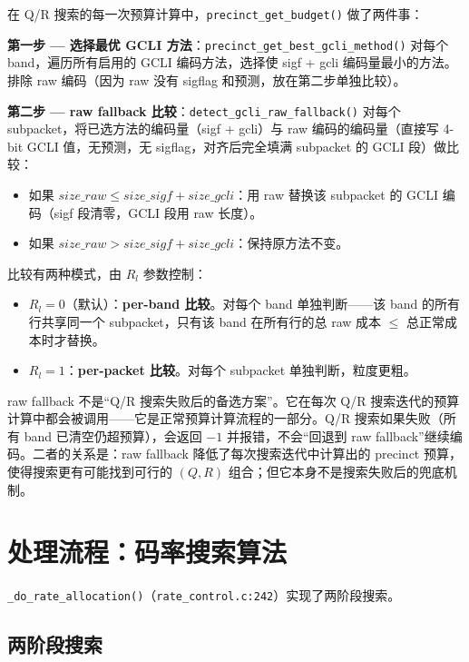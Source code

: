 在 Q/R 搜索的每一次预算计算中，\texttt{precinct\_get\_budget()} 做了两件事：

\textbf{第一步 — 选择最优 GCLI 方法}：\texttt{precinct\_get\_best\_gcli\_method()} 对每个 band，遍历所有启用的 GCLI 编码方法，选择使 sigf + gcli 编码量最小的方法。排除 raw 编码（因为 raw 没有 sigflag 和预测，放在第二步单独比较）。

\textbf{第二步 — raw fallback 比较}：\texttt{detect\_gcli\_raw\_fallback()} 对每个 subpacket，将已选方法的编码量（sigf + gcli）与 raw 编码的编码量（直接写 4-bit GCLI 值，无预测，无 sigflag，对齐后完全填满 subpacket 的 GCLI 段）做比较：

\begin{itemize}
  \item 如果 $\mathit{size\_raw} \leq \mathit{size\_sigf} + \mathit{size\_gcli}$：用 raw 替换该 subpacket 的 GCLI 编码（sigf 段清零，GCLI 段用 raw 长度）。
  \item 如果 $\mathit{size\_raw} > \mathit{size\_sigf} + \mathit{size\_gcli}$：保持原方法不变。
\end{itemize}

比较有两种模式，由 $R_l$ 参数控制：
\begin{itemize}
  \item $R_l = 0$（默认）：\textbf{per-band 比较}。对每个 band 单独判断——该 band 的所有行共享同一个 subpacket，只有该 band 在所有行的总 raw 成本 $\leq$ 总正常成本时才替换。
  \item $R_l = 1$：\textbf{per-packet 比较}。对每个 subpacket 单独判断，粒度更粗。
\end{itemize}

\begin{engineeringnote}
raw fallback 不是``Q/R 搜索失败后的备选方案''。它在每次 Q/R 搜索迭代的预算计算中都会被调用——它是正常预算计算流程的一部分。Q/R 搜索如果失败（所有 band 已清空仍超预算），会返回 $-1$ 并报错，不会``回退到 raw fallback''继续编码。二者的关系是：raw fallback 降低了每次搜索迭代中计算出的 precinct 预算，使得搜索更有可能找到可行的 $(Q, R)$ 组合；但它本身不是搜索失败后的兜底机制。
\end{engineeringnote}

\section{处理流程：码率搜索算法}

\texttt{\_do\_rate\_allocation()}（\texttt{rate\_control.c:242}）实现了两阶段搜索。

\subsection{两阶段搜索}

